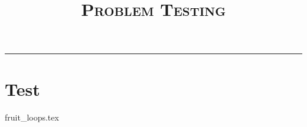 \documentclass{exam}
\title{\textsc{Problem Testing}}
\begin{document}
\maketitle
\rule{\textwidth}{0.15em}
\fontsize{12}{15}\selectfont

\section{Test}
\begin{questions}
{fruit_loops.tex}
\end{questions}
\end{document}
